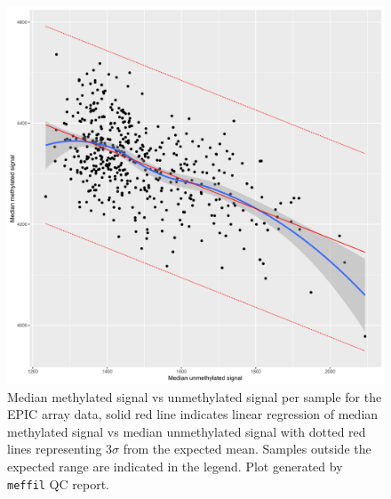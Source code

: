 \documentclass[
]{book}
\begin{document}
\begin{figure}

{\centering \includegraphics[width=0.8\linewidth]{figs/SWSqcEPICmethVsUnmeth} 

}

\caption{Median methylated signal vs unmethylated signal per sample for the EPIC array data, solid red line indicates linear regression of median methylated signal vs median unmethylated signal with dotted red lines representing \(3\sigma\) from the expected mean. Samples outside the expected range are indicated in the legend. Plot generated by \texttt{meffil} QC report.}\label{fig:SWSqcEPICmethVsUnmeth}
\end{figure}
\end{document}
